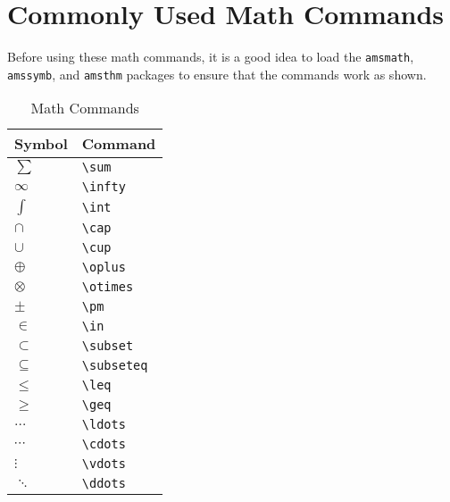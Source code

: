 \chapter{Commonly Used Math Commands}
\label{cha:commonly-used-math}

Before using these math commands, it is a good idea to load the
\texttt{amsmath}, \texttt{amssymb}, and \texttt{amsthm} packages to
ensure that the commands work as shown.

\begin{table}
  \centering
  \caption{Math Commands}
  \label{tab:math-commands}
  \begin{tabular}{@{}ll@{}}
    \toprule
    Symbol & Command \\
    \midrule
    $\sum$ & \verb|\sum| \\
    $\infty$ & \verb|\infty| \\
    $\int$ & \verb|\int| \\
    $\cap$ & \verb|\cap| \\
    $\cup$ & \verb|\cup| \\
    $\oplus$ & \verb|\oplus| \\
    $\otimes$ & \verb|\otimes| \\
    $\pm$ & \verb|\pm| \\
    $\in$ & \verb|\in| \\
    $\subset$ & \verb|\subset| \\
    $\subseteq$ & \verb|\subseteq| \\
    $\leq$ & \verb|\leq| \\
    $\geq$ & \verb|\geq| \\
    $\ldots$ & \verb|\ldots| \\
    $\cdots$ & \verb|\cdots| \\
    $\vdots$ & \verb|\vdots| \\
    $\ddots$ & \verb|\ddots| \\
    \bottomrule
  \end{tabular}  
\end{table}


